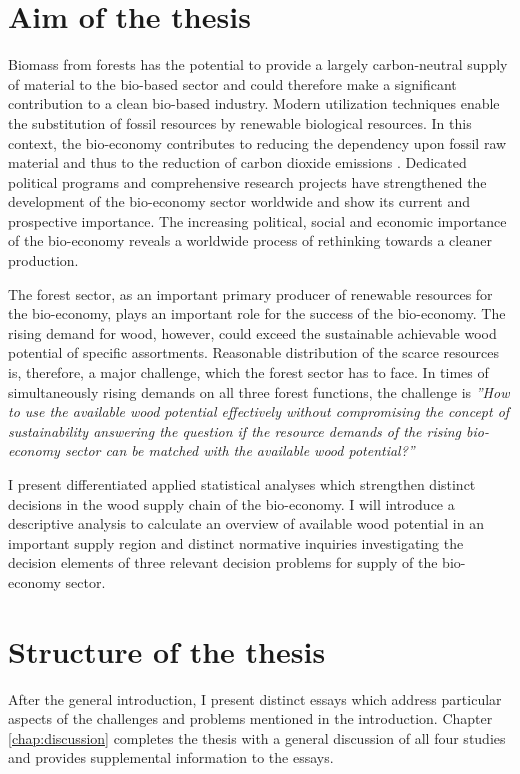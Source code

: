 \section{Aim of the thesis}
\label{sec:intro:aim}
Biomass from forests has the potential to provide a largely carbon-neutral supply of material to the bio-based sector and could therefore make a significant contribution to a clean bio-based industry. Modern utilization techniques enable the substitution of fossil resources by renewable biological resources. In this context, the bio-economy contributes to reducing the dependency upon fossil raw material and thus to the reduction of carbon dioxide emissions \citep[p. 4]{ingrao_2016}. Dedicated political programs and comprehensive research projects have strengthened the development of the bio-economy sector worldwide and show its current and prospective importance. The increasing political, social and economic importance of the bio-economy \citep[e.g.][p. 15-16]{bmel_2014b} reveals a worldwide process of rethinking towards a cleaner production.

The forest sector, as an important primary producer of renewable resources for the bio-economy, plays an important role for the success of the bio-economy. The rising demand for wood, however, could exceed the sustainable achievable wood potential of specific assortments. Reasonable distribution of the scarce resources is, therefore, a major challenge, which the forest sector has to face. In times of simultaneously rising demands on all three forest functions, the challenge is \textit{''How to use the available wood potential effectively without compromising the concept of sustainability answering the question if the resource demands of the rising bio-economy sector can be matched with the available wood potential?''}

I present differentiated applied statistical analyses which strengthen distinct decisions in the wood supply chain of the bio-economy. I will introduce a descriptive analysis to calculate an overview of available wood potential in an important supply region and distinct normative inquiries investigating the decision elements of three relevant decision problems for supply of the bio-economy sector.
	
\section{Structure of the thesis}
\label{sec:intro:struct}
After the general introduction, I present distinct essays which address particular aspects of the challenges and problems mentioned in the introduction. Chapter \ref{chap:discussion} completes the thesis with a general discussion of all four studies and provides supplemental information to the essays.

